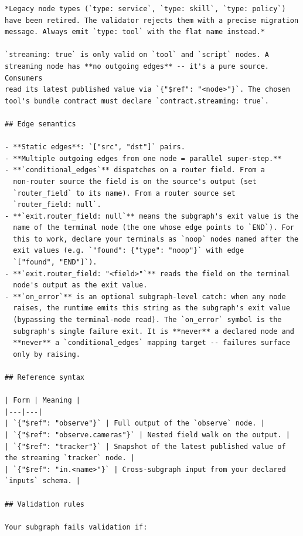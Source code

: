 \begin{lstlisting}
*Legacy node types (`type: service`, `type: skill`, `type: policy`)
have been retired. The validator rejects them with a precise migration
message. Always emit `type: tool` with the flat name instead.*

`streaming: true` is only valid on `tool` and `script` nodes. A
streaming node has **no outgoing edges** -- it's a pure source. Consumers
read its latest published value via `{"$ref": "<node>"}`. The chosen
tool's bundle contract must declare `contract.streaming: true`.

## Edge semantics

- **Static edges**: `["src", "dst"]` pairs.
- **Multiple outgoing edges from one node = parallel super-step.**
- **`conditional_edges`** dispatches on a router field. From a
  non-router source the field is on the source's output (set
  `router_field` to its name). From a router source set
  `router_field: null`.
- **`exit.router_field: null`** means the subgraph's exit value is the
  name of the terminal node (the one whose edge points to `END`). For
  this to work, declare your terminals as `noop` nodes named after the
  exit values (e.g. `"found": {"type": "noop"}` with edge
  `["found", "END"]`).
- **`exit.router_field: "<field>"`** reads the field on the terminal
  node's output as the exit value.
- **`on_error`** is an optional subgraph-level catch: when any node
  raises, the runtime emits this string as the subgraph's exit value
  (bypassing the terminal-node read). The `on_error` symbol is the
  subgraph's single failure exit. It is **never** a declared node and
  **never** a `conditional_edges` mapping target -- failures surface
  only by raising.

## Reference syntax

| Form | Meaning |
|---|---|
| `{"$ref": "observe"}` | Full output of the `observe` node. |
| `{"$ref": "observe.cameras"}` | Nested field walk on the output. |
| `{"$ref": "tracker"}` | Snapshot of the latest published value of the streaming `tracker` node. |
| `{"$ref": "in.<name>"}` | Cross-subgraph input from your declared `inputs` schema. |

## Validation rules

Your subgraph fails validation if:


\end{lstlisting}
